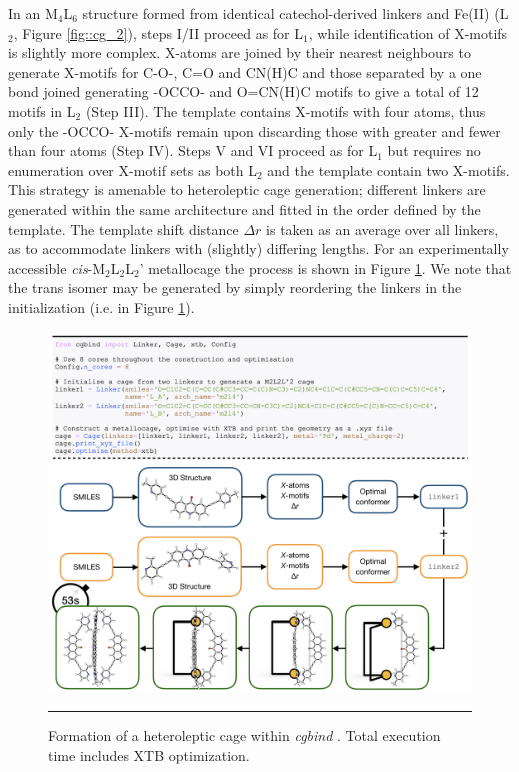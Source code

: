\documentclass[../../main.tex]{subfiles}
\newcommand{\cgbind}{\emph{cgbind }}
\newcommand{\MLs}{M$_4$L$_6$ }
\begin{document}
In an \MLs structure formed from identical catechol-derived linkers and Fe(II) (L${}_2$, Figure \ref{fig::cg_2}),\cite{Caulder1998} steps I/II proceed as for L${}_1$, while identification of X-motifs is slightly more complex. X-atoms are joined by their nearest neighbours to generate X-motifs for C-O-, C=O and CN(H)C and those separated by a one bond joined generating -OCCO- and O=CN(H)C motifs to give a total of 12 motifs in L${}_2$ (Step III). The template contains X-motifs with four atoms, thus only the -OCCO- X-motifs remain upon discarding those with greater and fewer than four atoms (Step IV). Steps V and VI proceed as for L${}_1$ but requires no enumeration over X-motif sets as both L${}_2$ and the template contain two X-motifs.
This strategy is amenable to heteroleptic cage generation; different linkers are generated within the same architecture and fitted in the order defined by the template. The template shift distance $\Delta r$ is taken as an average over all linkers, as to accommodate linkers with (slightly) differing lengths. For an experimentally accessible \textit{cis}-M$_2$L$_2$L$_2$’ metallocage\cite{Zhu2018} the process is shown in Figure \ref{fig::cg_3}. We note that the trans isomer may be generated by simply reordering the linkers in the  initialization (i.e.  in Figure \ref{fig::cg_3}).


\begin{figure}[h!]
	\vspace{0.4cm}
	\centering
	\includegraphics[width=\textwidth]{3/cgbind/figs/fig3}
	\vspace{0.2cm}
	\hrule
	\caption{Formation of a heteroleptic cage within \cgbind. Total execution time includes XTB optimization.}
	\label{fig::cg_3}
\end{figure}
\end{document}
